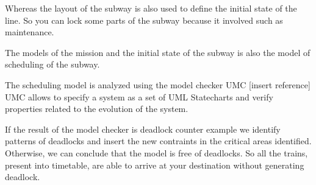 
Whereas the layout of the subway is also used to define the initial state of the line. So you can lock some parts of the subway because it involved such as maintenance.


The models of the mission and the initial state of the subway is also the model of scheduling of the subway.

The scheduling model is analyzed using the model checker UMC [insert reference]
UMC allows to specify a system as a set of UML Statecharts and verify properties related to the evolution of the system.


If the result of the model checker is deadlock counter example we identify patterns of deadlocks and insert the new contraints in the critical areas identified. Otherwise, we can conclude that the model is free of deadlocks. 
So all the trains, present into timetable, are able to arrive at your destination without generating deadlock.